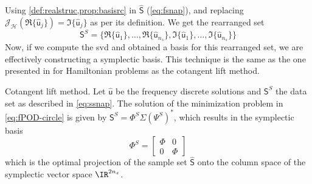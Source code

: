 Using \cref{def:realstruc,prop:basisrc} in $\widehat{\bm{\mathsf{S}}}$ (\cref{eq:fsnap}), and replacing $\mathcal{J}_{\mathcal{H}} (\Re \{ \widehat{\bm{\mathsf{u}}}_j \}) = \Im \{ \widehat{\bm{\mathsf{u}}}_j \}$ as per its definition. We get the rearranged set
\begin{equation} \label{eq:ssnap}
    \bm{\mathsf{S}}^S = \{ \Re \{ \widehat{\bm{\mathsf{u}}}_1 \}, \ldots, \Re \{ \widehat{\bm{\mathsf{u}}}_{n_s} \}, \Im \{ \widehat{\bm{\mathsf{u}}}_1 \}, \ldots, \Im \{ \widehat{\bm{\mathsf{u}}}_{n_s} \} \}
\end{equation}
Now, if we compute the \gls{svd} and obtained a basis for this rearranged set, we are effectively constructing a symplectic basis. This technique is the same as the one presented in \cite{peng_symplectic_2015} for Hamiltonian problems as the cotangent lift method.
\begin{theorem} {Cotangent lift method.} \label{th:symplectic}
    Let $\widehat{\bm{\mathsf{u}}}$ be the frequency discrete solutions and $\bm{\mathsf{S}}^S$ the data set as described in \cref{eq:ssnap}. The solution of the minimization problem in \cref{eq:fPOD-circle} is given by $\bm{\mathsf{S}}^S = \Phi^S \Sigma (\Psi^S)^*$, which results in the symplectic basis
    \begin{equation}
        \Phi^S =
    \begin{bmatrix}
        \Phi & 0 \\
        0 & \Phi
    \end{bmatrix}
    \end{equation}
    which is the optimal projection of the sample set $\widehat{\bm{\mathsf{S}}}$ onto the column space of the symplectic vector space $\IR^{2n_s}$.
\end{theorem}
